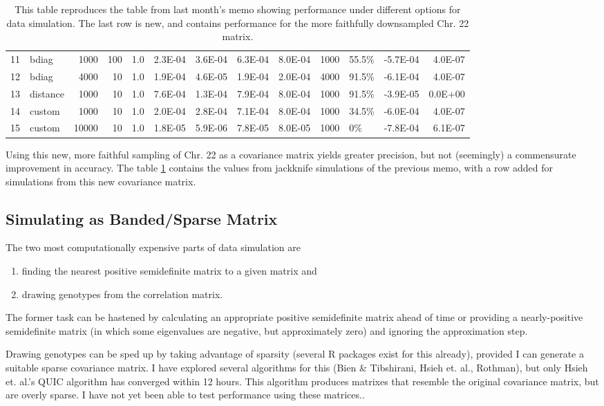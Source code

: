 \documentclass[12pt]{article}
\begin{document}
\begin{table}[ht]
{\begin{tabular}{rlrrrrrrrrlrr}
  11 & bdiag & 1000 & 100 & 1.0 & 2.3E-04 & 3.6E-04 & 6.3E-04 & 8.0E-04 & 1000 & 55.5\% & -5.7E-04 & 4.0E-07 \\ 
  12 & bdiag & 4000 & 10 & 1.0 & 1.9E-04 & 4.6E-05 & 1.9E-04 & 2.0E-04 & 4000 & 91.5\% & -6.1E-04 & 4.0E-07 \\ 
  13 & distance & 1000 & 10 & 1.0 & 7.6E-04 & 1.3E-04 & 7.9E-04 & 8.0E-04 & 1000 & 91.5\% & -3.9E-05 & 0.0E+00 \\ 
  14 & custom & 1000 & 10 & 1.0 & 2.0E-04 & 2.8E-04 & 7.1E-04 & 8.0E-04 & 1000 & 34.5\% & -6.0E-04 & 4.0E-07 \\ 
  15 & custom & 10000 & 10 & 1.0 & 1.8E-05 & 5.9E-06 & 7.8E-05 & 8.0E-05 & 1000 & 0\% & -7.8E-04 & 6.1E-07 \\ 
   \hline
\end{tabular}
}
\caption{This table reproduces the table from last month's memo showing performance under different options for data simulation. The last row is new, and contains performance for the more faithfully downsampled Chr. 22 matrix.}
\label{tabperform}
\end{table}

Using this new, more faithful sampling of Chr. 22 as a covariance matrix yields greater precision, but not (seemingly) a commensurate improvement in accuracy. The table \ref{tabperform} contains the values from jackknife simulations of the previous memo, with a row added for simulations from this new covariance matrix.

\subsection{Simulating as Banded/Sparse Matrix}

The two most computationally expensive parts of data simulation are
\begin{enumerate}
\item finding the nearest positive semidefinite matrix to a given matrix and
\item drawing genotypes from the correlation matrix.
\end{enumerate}
The former task can be hastened by calculating an appropriate positive semidefinite matrix ahead of time or providing a nearly-positive semidefinite matrix (in which some eigenvalues are negative, but approximately zero) and ignoring the approximation step.

Drawing genotypes can be sped up by taking advantage of sparsity (several R packages exist for this already), provided I can generate a suitable sparse covariance matrix. I have explored several algorithms for this (Bien \& Tibshirani, Hsieh et. al., Rothman), but only Hsieh et. al.'s QUIC algorithm has converged within 12 hours. This algorithm produces matrixes that resemble the original covariance matrix, but are overly sparse. I have not yet been able to test performance using these matrices..
\end{document}
